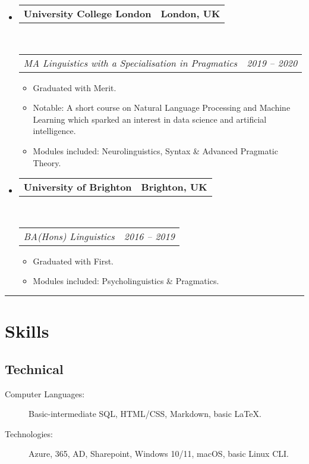 \documentclass[10pt,a4paper]{article}
\makeatletter
\newenvironment{indentsection}[1]%
{\begin{list}{}%
	{\setlength{\leftmargin}{#1}}%
	\item[]%
}
{\end{list}}
\newcommand{\headerrow}[2]
{\begin{tabular*}{\linewidth}{l@{\extracolsep{\fill}}r}
	#1 &
	#2 \\
\end{tabular*}}
\makeatother
\begin{document}
\begin{itemize}
	\parskip=0.1em

	\item 
	\headerrow
		{\textbf{University College London}}
		{\textbf{London, UK}}
	\\
	\headerrow
		{\emph{MA Linguistics with a Specialisation in Pragmatics}}
		{\emph{2019 -- 2020}}
	\begin{itemize}
		\item Graduated with Merit.
		\item Notable: A short course on Natural Language Processing and Machine Learning which sparked an interest in data science and artificial intelligence.
		\item Modules included: Neurolinguistics, Syntax \& Advanced Pragmatic Theory.
	\end{itemize}
    \item 
	\headerrow
		{\textbf{University of Brighton}}
		{\textbf{Brighton, UK}}
	\\
	\headerrow
		{\emph{BA(Hons) Linguistics}}
		{\emph{2016 -- 2019}}
	\begin{itemize}
		\item Graduated with First.
		\item Modules included: Psycholinguistics \& Pragmatics.
	\end{itemize}
\end{itemize}

\hrule
\vspace{1.75em}

\section*{Skills}
\subsection*{Technical}
\begin{indentsection}{\parindent}
\begin{description}
	\item[Computer Languages:]
	Basic-intermediate SQL, HTML/CSS, Markdown, basic \LaTeX.
    \item[Technologies:]
    Azure, 365, AD, Sharepoint, Windows 10/11, macOS, basic Linux CLI.
\end{description}
\end{indentsection}
\end{document}
